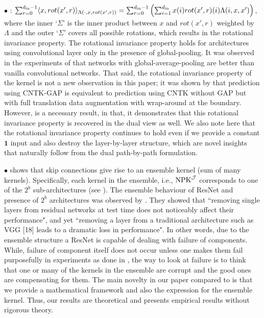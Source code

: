 $\bullet$ : $\sum_{r=0}^{d_{\text{in}}-1} \langle x,rot(x',r)\rangle_{\Lambda(\cdot, x,rot(x',r))}=\sum_{r=0}^{d_{\text{in}}-1} \left(\sum_{i=1}^{d_{\text{in}}} x(i) rot(x',r)(i)\Lambda(i,x,x')\right)$, where the inner `$\Sigma$' is the inner product between $x$ and $rot(x',r)$ weighted by $\Lambda$ and the outer `$\Sigma$' covers all possible rotations, which results in the rotational invariance property. The rotational invariance property holds for architectures using convolutional layer only in the presence of global-pooling. It was observed in the experiments of \cite{arora2019exact} that networks with global-average-pooling are better than vanilla convolutional networks. That said, the rotational invariance property of the kernel is not a new observation in this paper; it was shown by \cite{li2019enhanced} that  prediction using CNTK-GAP is equivalent to prediction using CNTK without GAP but with full translation data augmentation with wrap-around at the boundary. However,  is a necessary result, in that, it demonstrates that this rotational invariance property is recovered in the dual view as well. We also note here that the rotational invariance property continues to hold even if we provide a constant $\mathbf{1}$ input and also destroy the layer-by-layer structure, which are novel insights that naturally follow from the dual path-by-path formulation.

$\bullet$  shows that skip connections give rise to an ensemble kernel (sum of many kernels). Specifically, each kernel in the ensemble, i.e., $\text{NPK}^{\mathcal{J}}$ corresponds to one of the $2^b$ sub-architectures (see ). The ensemble behaviour of ResNet and  presence of $2^b$ architectures was observed by \cite{veit2016residual}. They showed that  ``removing single layers from residual networks at test time does not noticeably affect their performance", and yet ``removing a layer from a traditional architecture such as VGG [18] leads to a dramatic loss in performance". In other words, due to the ensemble structure a ResNet is capable of dealing with failure of components. While, failure of component itself does not occur unless one makes them fail purposefully in experiments as done in \citep{veit2016residual},  the way to look at failure is to think that one or many of the kernels in the ensemble are corrupt and the good ones are compensating for them. The main novelty in our paper compared to \citep{veit2016residual} is that we provide a mathematical framework and also the expression for the ensemble kernel. Thus, our results are theoretical and \citep{veit2016residual} presents empirical results without rigorous theory.


